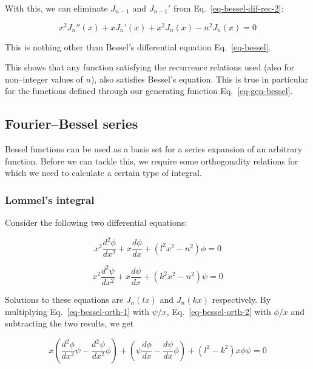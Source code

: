 With this, we can eliminate $J_{n-1}$ and $J_{n-1}'$ from Eq.~\ref{eq-bessel-dif-rec-2}:

\begin{equation}
x^2 J_n''(x) +  x J_n'(x) + x^2 J_n(x) - n^2 J_n(x) = 0
\end{equation} 

This is nothing other than Bessel's differential equation Eq.~\ref{eq-bessel}.

This shows that any function satisfying the recurrence relations used (also for non--integer values of $n$), also satisfies Bessel's equation. This is true in particular for the functions defined through our generating function Eq.~\ref{eq-gen-bessel}.

\subsection{Fourier--Bessel series}

Bessel functions can be used as a basis set for a series expansion of an arbitrary function. Before we can tackle this, we require some orthogonality relations for which we need to calculate a certain type of integral.

\subsubsection{Lommel's integral}

Consider the following two differential equations:

\begin{equation}
x^2 \frac{d^2 \phi}{dx^2}  + x \frac{d \phi}{dx} + \left(l^2x^2 - n^2\right) \phi = 0 \label{eq-bessel-orth-1}
\end{equation} 

\begin{equation}
x^2 \frac{d^2 \psi}{dx^2}  + x \frac{d \psi}{dx} + \left(k^2x^2 - n^2\right) \psi = 0 \label{eq-bessel-orth-2}
\end{equation} 

Solutions to these equations are $J_n(lx)$ and $J_n(kx)$ respectively. By multiplying Eq.~\ref{eq-bessel-orth-1} with $\psi/x$, Eq.~\ref{eq-bessel-orth-2} with $\phi/x$ and subtracting the two results, we get

\begin{equation}
x \left( \frac{d^2 \phi}{dx^2}\psi - \frac{d^2 \psi}{dx^2} \phi \right) + \left(\psi \frac{d \phi}{dx}- \frac{d \psi}{dx}\phi\right) + \left(l^2 - k^2\right) x \phi \psi = 0
\end{equation}

